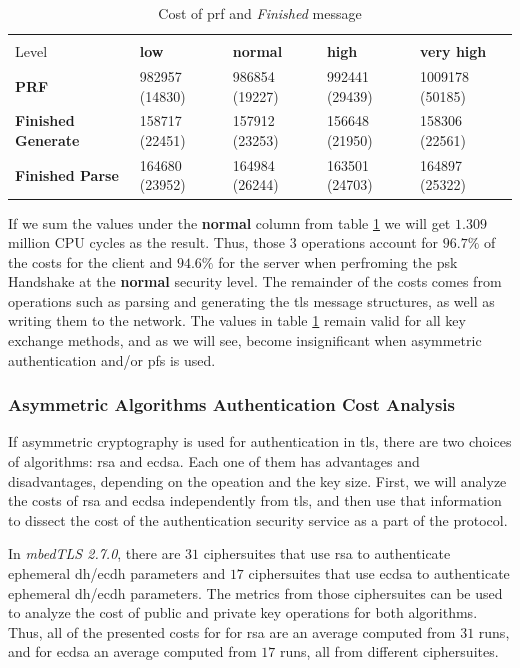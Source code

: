 \begin{table}[]
\begin{tabular}{|l|l|l|l|l|}
\hline
 \backslashbox{Opeation}{Security\\Level}                       & \textbf{low}   & \textbf{normal} & \textbf{high}  & \textbf{very high} \\ \hline
\textbf{PRF}            & 982957 (14830) & 986854 (19227)  & 992441 (29439) & 1009178 (50185)    \\ \hline
\textbf{Finished Generate} & 158717 (22451) & 157912 (23253)  & 156648 (21950) & 158306 (22561)     \\ \hline
\textbf{Finished Parse} & 164680 (23952) & 164984 (26244)  & 163501 (24703) & 164897 (25322)     \\ \hline
\end{tabular}
\centering \caption{\label{table:hs-key-gen-cost} Cost of \gls{prf} and \textit{Finished} message}
\end{table}

If we sum the values under the \textbf{normal} column from table \ref{table:hs-key-gen-cost} we will get $1.309$ million CPU cycles as the result.
Thus, those $3$ operations account for $96.7\%$ of the costs for the client and $94.6\%$ for the server when perfroming the \gls{psk} Handshake
at the \textbf{normal} security level. The remainder of the costs comes from operations such as parsing and generating the \gls{tls} message structures,
as well as writing them to the network. The values in table \ref{table:hs-key-gen-cost} remain valid for all key exchange methods, and as we will see,
become insignificant when asymmetric authentication and/or \gls{pfs} is used.

\subsubsection{Asymmetric Algorithms Authentication Cost Analysis} \label{sec:asym-algs-analysis}

If asymmetric cryptography is used for authentication in \gls{tls}, there are two
choices of algorithms: \gls{rsa} and \gls{ecdsa}. Each one of them has advantages and disadvantages, depending on the
opeation and the key size. First, we will analyze the costs of \gls{rsa} and \gls{ecdsa} independently from \gls{tls},
and then use that information to dissect the cost of the authentication security service as a part of the protocol.

In \textit{mbedTLS 2.7.0}, there are $31$ ciphersuites that use \gls{rsa} to authenticate ephemeral \gls{dh}/\gls{ecdh} parameters
and $17$ ciphersuites that use \gls{ecdsa} to authenticate ephemeral \gls{dh}/\gls{ecdh} parameters. The metrics from those
ciphersuites can be used to analyze the cost of public and private key operations for both algorithms. Thus, all of the presented
costs for for \gls{rsa} are an average computed from $31$ runs, and for \gls{ecdsa} an average computed from $17$ runs, all from
different ciphersuites.

